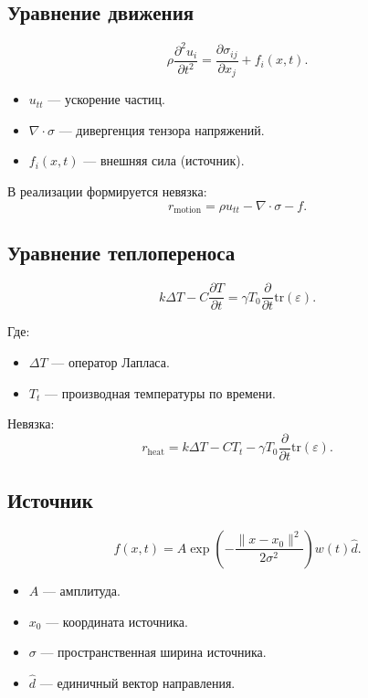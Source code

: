 \documentclass[12pt]{article}
\begin{document}
\subsection{Уравнение движения}

\[
\rho \frac{\partial^2 u_i}{\partial t^2}
=
\frac{\partial \sigma_{ij}}{\partial x_j}
+
f_i(x,t).
\]

\begin{itemize}
\item $u_{tt}$ --- ускорение частиц.
\item $\nabla \cdot \sigma$ --- дивергенция тензора напряжений.
\item $f_i(x,t)$ --- внешняя сила (источник).
\end{itemize}

В реализации формируется невязка:
\[
r_{\text{motion}}
=
\rho u_{tt}
-
\nabla \cdot \sigma
-
f.
\]

\subsection{Уравнение теплопереноса}

\[
k \Delta T
-
C \frac{\partial T}{\partial t}
=
\gamma T_0
\frac{\partial}{\partial t}
\mathrm{tr}(\varepsilon).
\]

Где:

\begin{itemize}
\item $\Delta T$ --- оператор Лапласа.
\item $T_t$ --- производная температуры по времени.
\end{itemize}

Невязка:
\[
r_{\text{heat}}
=
k \Delta T
-
C T_t
-
\gamma T_0 \frac{\partial}{\partial t}
\mathrm{tr}(\varepsilon).
\]

\subsection{Источник}

\[
f(x,t)
=
A
\exp
\left(
-\frac{\|x-x_0\|^2}{2\sigma^2}
\right)
w(t)
\hat d.
\]

\begin{itemize}
\item $A$ --- амплитуда.
\item $x_0$ --- координата источника.
\item $\sigma$ --- пространственная ширина источника.
\item $\hat d$ --- единичный вектор направления.
\end{itemize}
\end{document}
